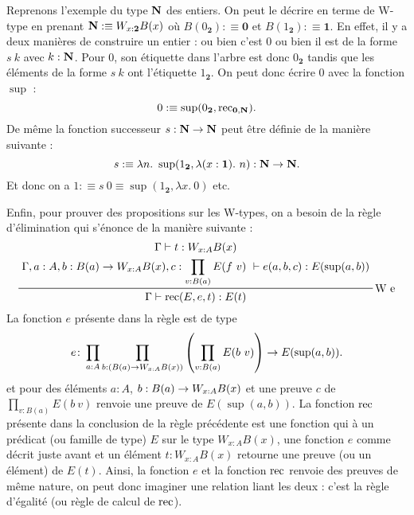 \documentclass[../../rapport.tex]{subfiles}
\begin{document}
  \begin{figure}[ht]
    \centering
  \end{figure}

  Reprenons l'exemple du type $\mathbf N$ des entiers.
  On peut le décrire en terme de W-type en prenant $\mathbf N :\equiv W_{x: \textbf{2}}B(x)$ où $B(0_{\textbf{2}}) :\equiv \textbf{0}$
  et $B(1_{\textbf{2}}) :\equiv \textbf{1}$.
  En effet, il y a deux manières de construire un entier : ou bien c'est 0 ou bien il est de la forme $s\ k$ avec $k : \mathbf N$.
  Pour 0, son étiquette dans l'arbre est donc $0_{\textbf{2}}$ tandis que les éléments de la forme $s\ k$ ont l'étiquette
  $1_{\textbf{2}}$.
  On peut donc écrire 0 avec la fonction $\sup$ :
  $$ 0 :\equiv \sup(0_{\textbf{2}}, \operatorname{rec}_{\textbf{0}, \mathbf N}).$$
  De même la fonction successeur $s : \mathbf N \rightarrow \mathbf N$ peut être définie de la manière suivante :
  $$ s :\equiv \lambda n.\ \sup(1_{\textbf{2}}, \lambda(x : \textbf{1}).\ n) : \mathbf N \rightarrow \mathbf N.$$
  Et donc on a $1 :\equiv s\ 0 \equiv \sup(1_{\textbf{2}}, \lambda x.\ 0)$ etc.

  Enfin, pour prouver des propositions sur les W-types, on a besoin de la règle d'élimination qui s'énonce de la manière suivante :
  $$
  \prfinterspace=0.8em
  \prftree[r]{W e}
  {
    \prfStackPremises
    {\Gamma \vdash t : W_{x:A}B(x)}
    {\Gamma, a : A, b : B(a) \fun W_{x:A}B(x), c : \prod_{v : B(a)}{E(f\ v)}\ \vdash e(a, b, c) : E(\sup(a, b))}
  }
      {\Gamma \vdash \rec(E, e, t) : E(t)}
  $$
  La fonction $e$ présente dans la règle est de type
  $$e \colon \prod_{a:A}\prod_{b:(B(a) \rightarrow W_{x:A}B(x))}\left(\prod_{v:B(a)}E(b\ v)\right) \rightarrow E(\sup(a, b)).$$
  et pour des éléments $a : A$, $b : B(a) \rightarrow W_{x:A}B(x)$ et une preuve $c$ de $\prod_{v:B(a)}{E(b\ v)}$
  renvoie une preuve de $E(\sup(a, b))$.
  La fonction $\operatorname{rec}$ présente dans la conclusion de la règle précédente est une fonction qui à un prédicat
  (ou famille de type) $E$ sur le type $W_{x:A}B(x)$, une fonction $e$ comme décrit juste avant et un élément $t : W_{x:A}B(x)$
  retourne une preuve (ou un élément) de $E(t)$. Ainsi, la fonction $e$ et la fonction $\operatorname{rec}$ renvoie des preuves de même nature,
  on peut donc imaginer une relation liant les deux : c'est la règle d'égalité (ou règle de calcul de $\operatorname{rec}$).
\end{document}
